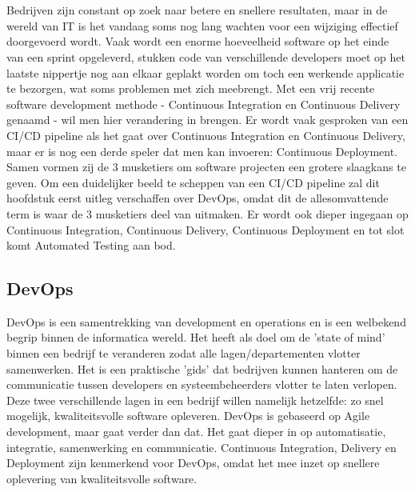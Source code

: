 \chapter[Continuous Integration, Delivery \& Deployment]{}
\label{ch:ci-cd-cd}
Bedrijven zijn constant op zoek naar betere en snellere resultaten, maar in de wereld van IT is het vandaag soms nog lang wachten voor een wijziging effectief doorgevoerd wordt. Vaak wordt een enorme hoeveelheid software op het einde van een sprint opgeleverd, stukken code van verschillende developers moet op het laatste nippertje nog aan elkaar geplakt worden om toch een werkende applicatie te bezorgen, wat soms problemen met zich meebrengt. Met een vrij recente software development methode - Continuous Integration en Continuous Delivery genaamd - wil men hier verandering in brengen. Er wordt vaak gesproken van een CI/CD pipeline als het gaat over Continuous Integration en Continuous Delivery, maar er is nog een derde speler dat men kan invoeren: Continuous Deployment. Samen vormen zij de 3 musketiers om software projecten een grotere slaagkans te geven.
Om een duidelijker beeld te scheppen van een CI/CD pipeline zal dit hoofdstuk eerst uitleg verschaffen over DevOps, omdat dit de allesomvattende term is waar de 3 musketiers deel van uitmaken. Er wordt ook dieper ingegaan op Continuous Integration, Continuous Delivery, Continuous Deployment en tot slot komt Automated Testing aan bod.
        \section{DevOps}
        DevOps is een samentrekking van development en operations en is een welbekend begrip binnen de informatica wereld. Het heeft als doel om de 'state of mind' binnen een bedrijf te veranderen zodat alle lagen/departementen vlotter samenwerken. Het is een praktische 'gids' dat bedrijven kunnen hanteren om de communicatie tussen developers en systeembeheerders vlotter te laten verlopen. Deze twee verschillende lagen in een bedrijf willen namelijk hetzelfde: zo snel mogelijk, kwaliteitsvolle software opleveren. DevOps is gebaseerd op Agile development, maar gaat verder dan dat. Het gaat dieper in op automatisatie, integratie, samenwerking en communicatie. 
        Continuous Integration, Delivery en Deployment zijn kenmerkend voor DevOps, omdat het mee inzet op snellere oplevering van kwaliteitsvolle software. ~\autocite{Riti2018}
    
